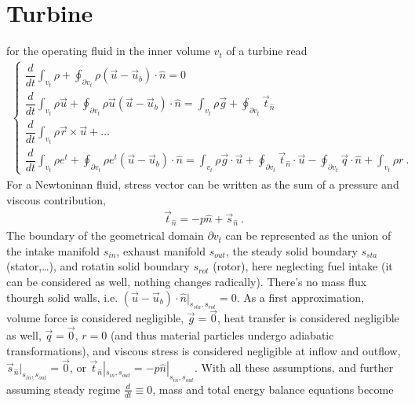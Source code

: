\documentclass[letterpaper,10pt,english]{jupyterBook}
\begin{document}
\section{Turbine}
\label{\detokenize{ch/thermodynamic-transformations:turbine}}\label{\detokenize{ch/thermodynamic-transformations:classical-thermodynamics-transformations-turbine}}
\sphinxAtStartPar
{} for the operating fluid in the inner volume \(v_t\) of a turbine read
\begin{equation*}
\begin{split}\begin{cases}
  \dfrac{d}{dt} \displaystyle\int_{v_t} \rho + \oint_{\partial v_t} \rho ( \vec{u} - \vec{u}_b ) \cdot \hat{n} = 0  \\
  \dfrac{d}{dt} \displaystyle\int_{v_t} \rho \vec{u} + \oint_{\partial v_t} \rho \vec{u} ( \vec{u} - \vec{u}_b ) \cdot \hat{n} = \int_{v_t} \rho \vec{g} + \oint_{\partial v_t} \vec{t}_{\hat{n}}  \\
  \dfrac{d}{dt} \displaystyle\int_{v_t} \rho \vec{r} \times \vec{u} + \dots \\
  \dfrac{d}{dt} \displaystyle\int_{v_t} \rho e^t + \oint_{\partial v_t} \rho e^t ( \vec{u} - \vec{u}_b ) \cdot \hat{n} = \int_{v_t} \rho \vec{g} \cdot \vec{u} + \oint_{\partial v_t} \vec{t}_{\hat{n}} \cdot \vec{u} - \oint_{\partial v_t} \vec{q} \cdot \hat{n} + \int_{v_t} \rho r \ .
\end{cases}\end{split}
\end{equation*}
\sphinxAtStartPar
For a Newtoninan fluid, stress vector can be written as the sum of a pressure and viscous contribution,
\begin{equation*}
\begin{split}\vec{t}_{\hat{n}} = - p \hat{n} + \vec{s}_{\hat{n}} \ .\end{split}
\end{equation*}
\sphinxAtStartPar
The boundary of the geometrical domain \(\partial v_t\) can be represented as the union of the intake manifold \(s_{in}\), exhaust manifold \(s_{out}\), the steady solid boundary \(s_{sta}\) (stator,…), and rotatin solid boundary \(s_{rot}\) (rotor), here neglecting fuel intake (it can be considered as well, nothing changes radically). There’s no mass flux thourgh solid walls, i.e. \((\vec{u}-\vec{u}_b) \cdot \hat{n}|_{s_{sta}, s_{rot}} = 0\). As a first approximation, volume force is considered negligible, \(\vec{g} = \vec{0}\), heat transfer is considered negligible as well, \(\vec{q} = \vec{0}\), \(r = 0\) (and thus material particles undergo adiabatic transformations), and viscous stress is considered negligible at inflow and outflow, \(\vec{s}_{\hat{n}}|_{s_{in}, s_{out}} = \vec{0}\), or \(\vec{t}_{\hat{n}}|_{s_{in}, s_{out}} = - p \hat{n}|_{s_{in}, s_{out}}\). With all these assumptions, and further assuming steady regime \(\frac{d}{dt} \equiv 0\), mass and total energy balance equations become
\end{document}
